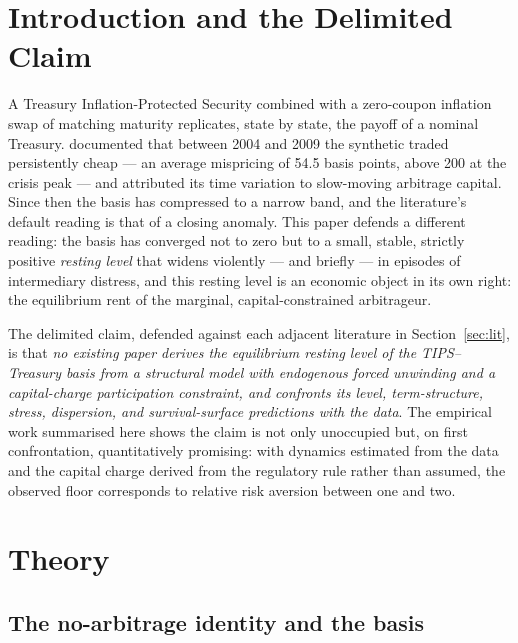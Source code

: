 \documentclass[11pt]{article}
\begin{document}
\begin{abstract}
reconciliation with the June 2026 Detailed Project Description, and a register of every test executed to date with its script and headline output.
\end{abstract}

\tableofcontents

\section{Introduction and the Delimited Claim}

A Treasury Inflation-Protected Security combined with a zero-coupon inflation swap of matching maturity replicates, state by state, the payoff of a nominal Treasury. \citet{fll2014} documented that between 2004 and 2009 the synthetic traded persistently cheap --- an average mispricing of 54.5 basis points, above 200 at the crisis peak --- and attributed its time variation to slow-moving arbitrage capital. Since then the basis has compressed to a narrow band, and the literature's default reading is that of a closing anomaly. This paper defends a different reading: the basis has converged not to zero but to a small, stable, strictly positive \emph{resting level} that widens violently --- and briefly --- in episodes of intermediary distress, and this resting level is an economic object in its own right: the equilibrium rent of the marginal, capital-constrained arbitrageur.

The delimited claim, defended against each adjacent literature in Section~\ref{sec:lit}, is that \emph{no existing paper derives the equilibrium resting level of the TIPS--Treasury basis from a structural model with endogenous forced unwinding and a capital-charge participation constraint, and confronts its level, term-structure, stress, dispersion, and survival-surface predictions with the data}. The empirical work summarised here shows the claim is not only unoccupied but, on first confrontation, quantitatively promising: with dynamics estimated from the data and the capital charge derived from the regulatory rule rather than assumed, the observed floor corresponds to relative risk aversion between one and two.

\section{Theory}\label{sec:theory}

\subsection{The no-arbitrage identity and the basis}
\end{document}
